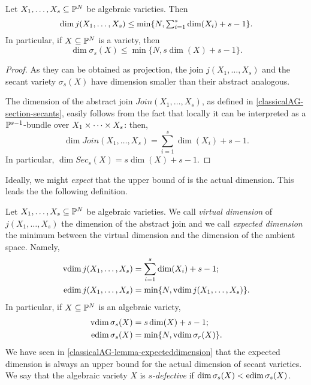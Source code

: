 \begin{lemma}
\label{classicalAG-lemma-expecteddimension}
Let $X_1, \ldots , X_s \subseteq \mathbb{P}^N$ be algebraic varieties. Then 
\[
    \dim j(X_1, \ldots , X_s) \leq \min\{ N, \textstyle\sum_{i=1}^s \dim(X_i) + s-1\}.
\]
In particular, if $X \subseteq \mathbb{P}^N$ is a variety, then 
\[
    \dim \sigma_s(X) \leq \min\{ N , s\dim(X) + s - 1\}.
\]
\begin{proof}
    As they can be obtained as projection, the join $j(X_1,\ldots,X_s)$ and the secant variety $\sigma_s(X)$ have dimension smaller than their abstract analogous.

    The dimension of the abstract join $Join(X_1,\ldots,X_s)$, as defined in \ref{classicalAG-section-secants}, easily follows from the fact that locally it can be interpreted as a $\mathbb{P}^{s-1}$-bundle over $X_1 \times \cdots \times X_s$: then, 
    \[
        \dim Join(X_1,\ldots,X_s) = \sum_{i=1}^s \dim(X_i) + s-1.
    \]
    In particular, $\dim Sec_s(X) = s\dim(X) + s-1$.
\end{proof}
\end{lemma}
Ideally, we might {\it expect} that the upper bound of \label{classicalAG-lemma-expecteddimension} is the actual dimension. This leads the the following definition. 
\begin{definition}
\label{classicalAG-definition-expecteddimension}
    Let $X_1, \ldots , X_s \subseteq \mathbb{P}^N$ be algebraic varieties. We call \emph{virtual dimension} of $j(X_1,\ldots,X_s)$ the dimension of the abstract join and we call \emph{expected dimension} the minimum between the virtual dimension and the dimension of the ambient space. Namely, 
    \begin{align*}
        \operatorname{vdim} j(X_1,\ldots,X_s) & = \sum_{i=1}^s \dim(X_i) + s-1; \\ 
        \operatorname{edim} j(X_1,\ldots,X_s) & = \min \{N,\operatorname{vdim} j(X_1,\ldots,X_s)\}.
    \end{align*}
    In particular, if $X \subseteq \mathbb{P}^N$ is an algebraic variety, 
    \begin{align*}
        \operatorname{vdim} \sigma_s(X) & = s\dim(X) + s-1; \\ 
        \operatorname{edim} \sigma_s(X) & = \min \{N,\operatorname{vdim} \sigma_r(X)\}.
    \end{align*}
    We have seen in \ref{classicalAG-lemma-expecteddimension} that the expected dimension is always an upper bound for the actual dimension of secant varieties. We say that the algebraic variety $X$ is \emph{$s$-defective} if $\dim \sigma_s(X) < \operatorname{edim}\sigma_s(X)$. 
\end{definition}

